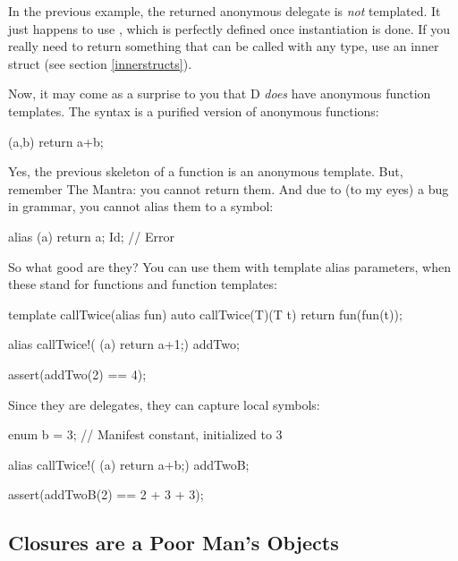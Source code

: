 In the previous example, the returned anonymous delegate is \emph{not} templated. It just happens to use , which is perfectly defined once instantiation is done. If you really need to return something that can be called with any type, use an inner struct (see section \ref{innerstructs}).

Now, it may come as a surprise to you that D \emph{does} have anonymous function templates. The syntax is a purified version of anonymous functions:

\begin{dcode}
(a,b) { return a+b;} 
\end{dcode} 

Yes, the previous skeleton of a function is an anonymous template. But, remember The Mantra: you cannot return them. And due to (to my eyes) a bug in  grammar, you cannot alias them to a symbol:

\begin{dcode}
alias (a){ return a;} Id; // Error
\end{dcode}

So what good are they? You can use them with template alias parameters, when these stand for functions and function templates:

\begin{dcode}
template callTwice(alias fun)
{
    auto callTwice(T)(T t)
    {
        return fun(fun(t));
    }
}

alias callTwice!( (a){ return a+1;}) addTwo;

assert(addTwo(2) == 4);
\end{dcode}

Since they are delegates, they can capture local symbols:

\begin{dcode}
enum b = 3; // Manifest constant, initialized to 3

alias callTwice!( (a){ return a+b;}) addTwoB;

assert(addTwoB(2) == 2 + 3 + 3);
\end{dcode}

\subsection{Closures are a Poor Man's Objects}\label{closuresareapoormansobjects}


